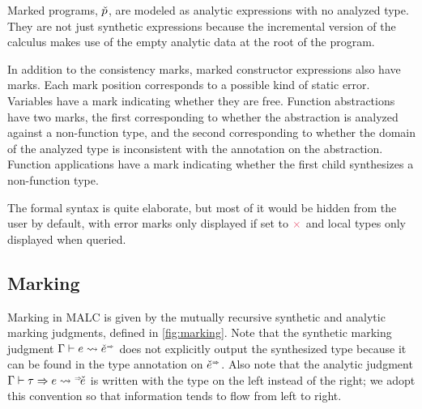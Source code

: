 Marked programs, $\check{p}$,  are modeled as analytic expressions with no analyzed type. They are not just synthetic expressions because the incremental version of the calculus makes use of the empty analytic data at the root of the program.  

  

In addition to the consistency marks, marked constructor expressions also have marks. Each mark position corresponds to a possible kind of static error. Variables have a mark indicating whether they are free. Function abstractions have two marks, the first corresponding to whether the abstraction is analyzed against a non-function type, and the second corresponding to whether the domain of the analyzed type is inconsistent with the annotation on the abstraction. Function applications have a mark indicating whether the first child synthesizes a non-function type. 

The formal syntax is quite elaborate, but most of it would be hidden from the user by default, with error marks only displayed if set to $\MBad$ and local types only displayed when queried.

\subsection{Marking}
Marking in MALC is given by the mutually recursive synthetic and analytic marking judgments, defined in \autoref{fig:marking}. Note that the synthetic marking judgment $\MarkSyn{\BEV}{\MEUV}$ does not explicitly output the synthesized type because it can be found in the type annotation on $\MEUV$. Also note that the analytic judgment $\MarkAna{\TV}{\BEV}{\MELV}$ is written with the type on the left instead of the right; we adopt this convention so that information tends to flow from left to right.  

